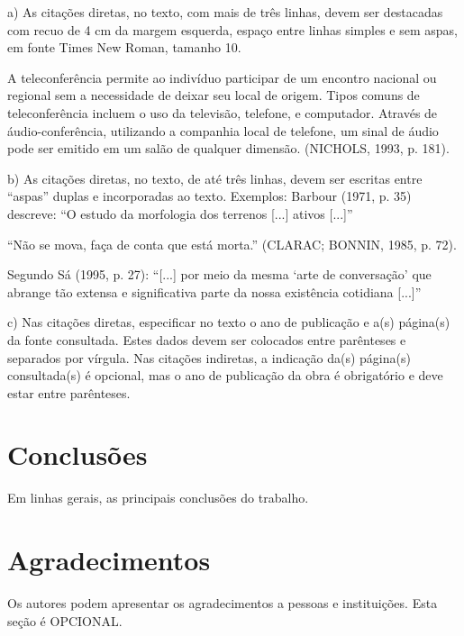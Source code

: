\documentclass[a4paper,11pt]{article}
\begin{document}
{\vskip 0.2cm
a) As citações diretas, no texto, com mais de três linhas, devem ser destacadas com recuo de 4 cm da margem esquerda, espaço entre linhas simples e sem aspas, em fonte Times New Roman, tamanho 10.

\begin{quoting}
A teleconferência permite ao indivíduo participar de um encontro nacional ou regional sem a necessidade de deixar seu local de origem. Tipos comuns de teleconferência incluem o uso da televisão, telefone, e computador. Através de áudio-conferência, utilizando a companhia local de telefone, um sinal de áudio pode ser emitido em um salão de qualquer dimensão. (NICHOLS, 1993, p. 181).
\end{quoting}

\vskip 0.2cm
b) As citações diretas, no texto, de até três linhas, devem ser escritas entre ``aspas'' duplas e incorporadas ao texto.
Exemplos:
Barbour (1971, p. 35) descreve: ``O estudo da morfologia dos terrenos [...] ativos [...]''

\vskip 0.2cm
``Não se mova, faça de conta que está morta.'' (CLARAC; BONNIN, 1985, p. 72).

\vskip 0.2cm
Segundo Sá (1995, p. 27): ``[...] por meio da mesma `arte de conversação' que abrange tão extensa e significativa parte da nossa existência cotidiana [...]''

\vskip 0.2cm
c) Nas citações diretas, especificar no texto o ano de publicação e a(s) página(s) da fonte consultada. Estes dados devem ser colocados entre parênteses e separados por vírgula. Nas citações indiretas, a indicação da(s) página(s) consultada(s) é opcional, mas o ano de publicação da obra é obrigatório e deve estar entre parênteses.


\section*{Conclusões}

Em linhas gerais, as principais conclusões do trabalho.



\section*{Agradecimentos}

Os autores podem apresentar os agradecimentos a pessoas e instituições. Esta seção é OPCIONAL.




}
\end{document}
